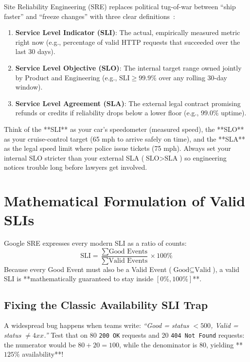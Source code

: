 Site Reliability Engineering (SRE) replaces political tug-of-war between ``ship faster'' and ``freeze changes'' with three clear definitions~\cite{beyer2016site}:
\begin{enumerate}[leftmargin=18pt]
  \item \textbf{Service Level Indicator (SLI)}: The actual, empirically measured metric right now (e.g., percentage of valid HTTP requests that succeeded over the last 30 days).
  \item \textbf{Service Level Objective (SLO)}: The internal target range owned jointly by Product and Engineering (e.g., $\text{SLI} \ge 99.9\%$ over any rolling 30-day window).
  \item \textbf{Service Level Agreement (SLA)}: The external legal contract promising refunds or credits if reliability drops below a lower floor (e.g., $99.0\%$ uptime).
\end{enumerate}

\begin{intuitionbox}
Think of the **SLI** as your car's speedometer (measured speed), the **SLO** as your cruise-control target (65 mph to arrive safely on time), and the **SLA** as the legal speed limit where police issue tickets (75 mph). Always set your internal SLO stricter than your external SLA ($\text{SLO} > \text{SLA}$) so engineering notices trouble long before lawyers get involved.
\end{intuitionbox}

\section{Mathematical Formulation of Valid SLIs}

Google SRE expresses every modern SLI as a ratio of counts:
\begin{equation}
\text{SLI} = \frac{\sum \text{Good Events}}{\sum \text{Valid Events}} \times 100\%
\end{equation}
Because every Good Event must also be a Valid Event ($\text{Good} \subseteq \text{Valid}$), a valid SLI is **mathematically guaranteed to stay inside $[0\%, 100\%]$**.

\subsection{Fixing the Classic Availability SLI Trap}

A widespread bug happens when teams write: \textit{``Good = status $< 500$, Valid = status $\neq 4xx$.''} Test that on 80 \texttt{200 OK} requests and 20 \texttt{404 Not Found} requests: the numerator would be $80 + 20 = 100$, while the denominator is $80$, yielding **$125\%$ availability**!

